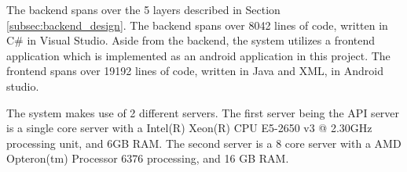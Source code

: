 The backend spans over the 5 layers described in Section \ref{subsec:backend_design}. The backend spans over 8042 lines of code, written in C\# in Visual Studio. Aside from the backend, the system utilizes a frontend application which is implemented as an android application in this project. The frontend spans over 19192 lines of code, written in Java and XML, in Android studio.

The system  makes use of 2 different servers. The first server being the API server is a single core server with a Intel(R) Xeon(R) CPU E5-2650 v3 @ 2.30GHz processing unit, and 6GB RAM. The second server is a 8 core server with a AMD Opteron(tm) Processor 6376 processing, and 16 GB RAM.